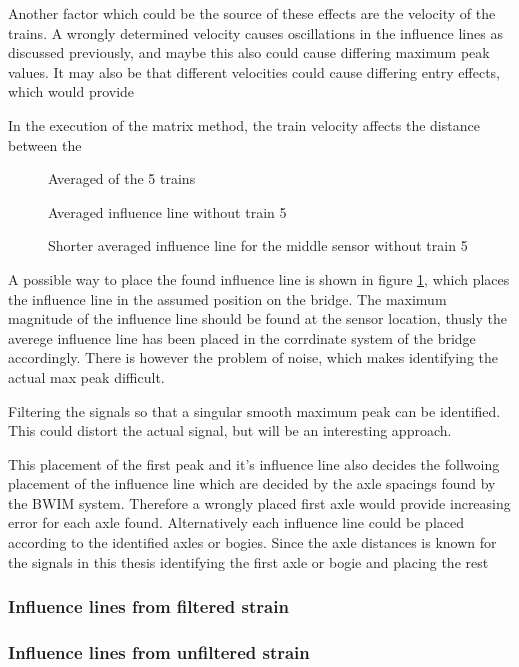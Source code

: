 Another factor which could be the source of these effects are the velocity of the trains. A wrongly determined velocity causes oscillations in the influence lines as discussed previously, and maybe this also could cause differing maximum peak values.
It may also be that different velocities could cause differing entry effects, which would provide



In the execution of the matrix method, the train velocity affects the distance between the
\begin{figure}[H]
	\begin{adjustbox}{center}
		
	\end{adjustbox}
	\caption{Averaged of the 5 trains}
	\label{fig:infl_vec_averaged_wBridge}
\end{figure}

\begin{figure}[H]
	\begin{adjustbox}{center}
		
	\end{adjustbox}
	\caption{Averaged influence line without train 5}
	\label{fig:infl_vec_averaged_wo_train5}
\end{figure}

\begin{figure}[H]
	\begin{adjustbox}{center}
		
	\end{adjustbox}
	\caption{Shorter averaged influence line for the middle sensor without train 5}
	\label{fig:infl_vec_averaged_fft10hz}
\end{figure}

A possible way to place the found influence line is shown in figure \ref{fig:infl_vec_averaged_wBridge}, which places the influence line in the assumed position on the bridge. The maximum magnitude of the influence line should be found at the sensor location, thusly the averege influence line has been placed in the corrdinate system of the bridge accordingly. There is however the problem of noise, which makes identifying the actual max peak difficult.

Filtering the signals so that a singular smooth maximum peak can be identified. This could distort the actual signal, but will be an interesting approach.

This placement of the first peak and it's influence line also decides the follwoing placement of the influence line which are decided by the axle spacings found by the BWIM system. Therefore a wrongly placed first axle would provide increasing error for each axle found.
Alternatively each influence line could be placed according to the identified axles or bogies. Since the axle distances is known for the signals in this thesis identifying the first axle or bogie and placing the rest
\subsubsection{Influence lines from filtered strain}

\subsubsection{Influence lines from unfiltered strain}
